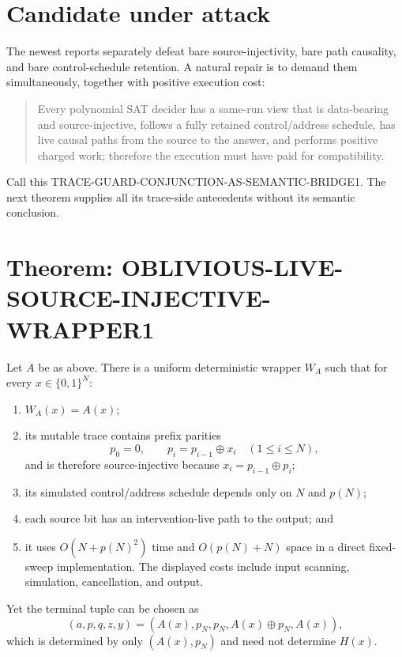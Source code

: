 \documentclass[11pt]{article}
\begin{document}
\section*{Candidate under attack}
The newest reports separately defeat bare source-injectivity, bare path
causality, and bare control-schedule retention.  A natural repair is to demand
them simultaneously, together with positive execution cost:
\begin{quote}
Every polynomial SAT decider has a same-run view that is data-bearing and
source-injective, follows a fully retained control/address schedule, has live
causal paths from the source to the answer, and performs positive charged work;
therefore the execution must have paid for compatibility.
\end{quote}
Call this \textsf{TRACE-GUARD-CONJUNCTION-AS-SEMANTIC-BRIDGE1}.  The next
theorem supplies all its trace-side antecedents without its semantic
conclusion.

\section*{Theorem: OBLIVIOUS-LIVE-SOURCE-INJECTIVE-WRAPPER1}
Let $A$ be as above.  There is a uniform deterministic wrapper $W_A$ such that
for every $x\in\{0,1\}^N$:
\begin{enumerate}
\item $W_A(x)=A(x)$;
\item its mutable trace contains prefix parities
\[
 p_0=0,\qquad p_i=p_{i-1}\oplus x_i\quad(1\le i\le N),
\]
and is therefore source-injective because $x_i=p_{i-1}\oplus p_i$;
\item its simulated control/address schedule depends only on $N$ and $p(N)$;
\item each source bit has an intervention-live path to the output; and
\item it uses $O(N+p(N)^2)$ time and $O(p(N)+N)$ space in a direct fixed-sweep
implementation.  The displayed costs include input scanning, simulation,
cancellation, and output.
\end{enumerate}
Yet the terminal tuple can be chosen as
\[
 (a,p,q,z,y)=(A(x),p_N,p_N,A(x)\oplus p_N,A(x)),
\]
which is determined by only $(A(x),p_N)$ and need not determine $H(x)$.
\end{document}
